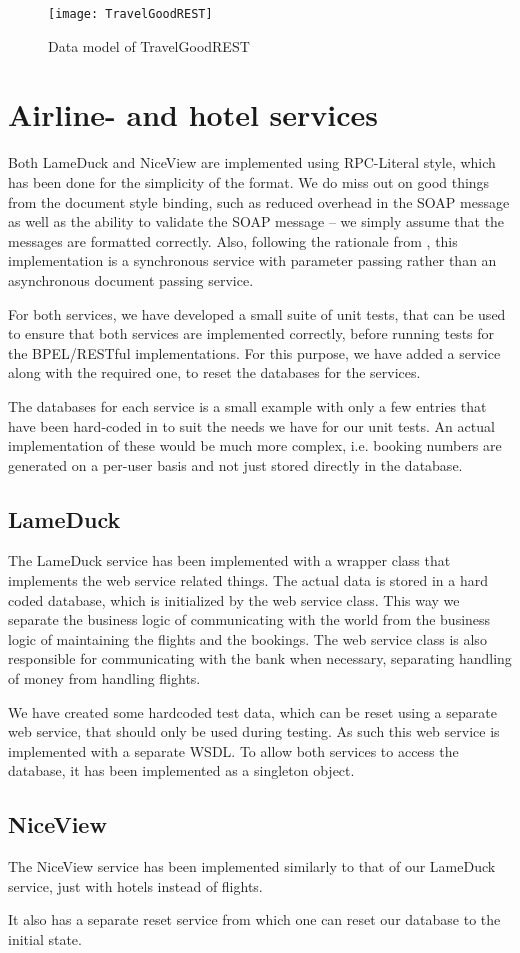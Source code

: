\begin{figure}[H]
\centering
\texttt{[image: TravelGoodREST]}
\caption{Data model of TravelGoodREST}
\label{fig:rest_class}
\end{figure}


\section{Airline- and hotel services}
Both LameDuck and NiceView are implemented using RPC-Literal style, which has been done for the simplicity of the format. We do miss out on good things from the document style binding, such as reduced overhead in the SOAP message as well as the ability to validate the SOAP message -- we simply assume that the messages are formatted correctly. 
Also, following the rationale from \cite{papazoglou2008web}, this implementation is a synchronous service with parameter passing rather than an asynchronous document passing service.

For both services, we have developed a small suite of unit tests, that can be used to ensure that both services are implemented correctly, before running tests for the BPEL/RESTful implementations. For this purpose, we have added a service along with the required one, to reset the databases for the services.

The databases for each service is a small example with only a few entries that have been hard-coded in to suit the needs we have for our unit tests. An actual implementation of these would be much more complex, i.e. booking numbers are generated on a per-user basis and not just stored directly in the database.

\subsection{LameDuck}
The LameDuck service has been implemented with a wrapper class that implements the web service related things. The actual data is stored in a hard coded database, which is initialized by the web service class. This way we separate the business logic of communicating with the world from the business logic of maintaining the flights and the bookings. The web service class is also responsible for communicating with the bank when necessary, separating handling of money from handling flights.

We have created some hardcoded test data, which can be reset using a separate web service, that should only be used during testing. As such this web service is implemented with a separate WSDL. To allow both services to access the database, it has been implemented as a singleton object.


\subsection{NiceView}
The NiceView service has been implemented similarly to that of our LameDuck service, just with hotels instead of flights.

It also has a separate reset service from which one can reset our database to the initial state.


